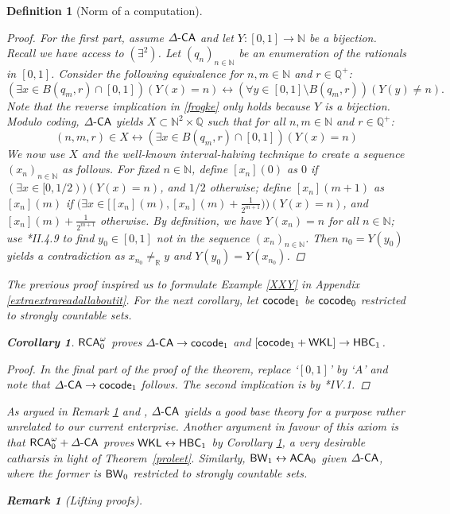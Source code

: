 \documentclass[reqno]{amsart}
\newtheorem{cor}[thm]{Corollary}
\newtheorem{defi}[thm]{Definition}
\newtheorem{rem}[thm]{Remark}
\newcommand\be{\begin{equation}}
\newcommand\ee{\end{equation}}
\def\RCAo{\textup{\textsf{RCA}}_{0}^{\omega}}
\def\WKL{\textup{\textsf{WKL}}}
\def\N{{\mathbb  N}}
\def\Q{{\mathbb  Q}}
\def\R{{\mathbb  R}}
\def\di{\rightarrow}
\def\asa{\leftrightarrow}
\def\ACA{\textup{\textsf{ACA}}}
\def\BW{\textup{\textsf{BW}}}
\def\cocode{\textup{\textsf{cocode}}}
\def\DCA{\Delta\textup{\textsf{-CA}}}
\def\HBC{\textup{\textsf{HBC}}}
\numberwithin{equation}{section}
\numberwithin{thm}{section}
\begin{document}
\begin{defi}[Norm of a computation]
\begin{proof}
\smallskip

For the first part, assume $\DCA$ and let $Y:[0,1]\di \N$ be a bijection.  
Recall we have access to $(\exists^{2})$. 
Let $(q_{n})_{n\in \N}$ be an enumeration of the rationals in $[0,1]$.
Consider the following equivalence for $n, m\in \N$ and $r\in \Q^{+}$:  
\be\label{frogke}
(\exists x\in B(q_{m}, r)\cap [0,1])(Y(x)=n)\asa (\forall y\in [0,1]\setminus B(q_{m}, r))(Y(y)\ne n).
\ee
Note that the reverse implication in \eqref{frogke} only holds because $Y$ is a bijection.  Modulo coding, $\DCA$ yields $X\subset \N^{2}\times \Q$ such that for all $n, m\in \N$ and $r\in \Q^{+}$:
\be\label{xdg}
(n,m, r)\in X\asa (\exists x\in B(q_{m}, r)\cap [0,1])(Y(x)=n)
\ee
We now use $X$ and the well-known interval-halving technique to create a sequence $(x_{n})_{n\in \N}$ as follows.  
For fixed $n\in \N$, define $[x_{n}](0)$ as $0$ if $(\exists x\in [0, 1/2))(Y(x)=n)$, and $1/2$ otherwise; define $[x_{n}](m+1)$ as $[x_{n}](m)$ if $(\exists x\in \big[[x_{n}](m), [x_{n}](m)+\frac{1}{2^{m+1}}\big)\big)(Y(x)=n)$, and $[x_{n}](m)+\frac{1}{2^{m+1}}$ otherwise.  By definition, we have $Y(x_{n})=n$ for all $n\in \N$; use \cite{simpson2}*{II.4.9} to find $y_{0}\in [0,1]$ not in the sequence $(x_{n})_{n\in \N}$.
Then $n_{0}=Y(y_{0})$ yields a contradiction as $x_{n_{0}}\ne_{\R} y $ and $Y(y_{0})=Y(x_{n_{0}})$.
\end{proof}
The previous proof inspired us to formulate Example \ref{XXY} in Appendix \ref{extraextrareadallaboutit}.
For the next corollary, let $\cocode_{1}$ be $\cocode_{0}$ restricted to strongly countable sets.  
\begin{cor}\label{holycoroly}
$\RCAo$ proves $\DCA\di \cocode_{1}$ and $[\cocode_{1}+\WKL]\di \HBC_{1}$.
\end{cor}
\begin{proof}
In the final part of the proof of the theorem, replace `$[0,1]$' by `$A$' and note that $\DCA\di \cocode_{1}$ follows.  
The second implication is by \cite{simpson2}*{IV.1}. 
\end{proof}
As argued in Remark \ref{DCA} and \cites{samrecount, samFLO2}, $\DCA$ yields a good base theory 
\emph{for a purpose rather unrelated to our current enterprise}.  Another argument in favour of this axiom is that $\RCAo+\DCA$ proves $\WKL\asa \HBC_{1}$ by Corollary \ref{holycoroly}, a very desirable \emph{catharsis} in light of Theorem~\ref{proleet}.  Similarly, $\BW_{1}\asa \ACA_{0}$ given $\DCA$, where the former is $\BW_{0}$ restricted to strongly countable sets.     
\begin{rem}[Lifting proofs]\label{DCA}\rm

\end{rem}
\end{defi}
\end{document}
